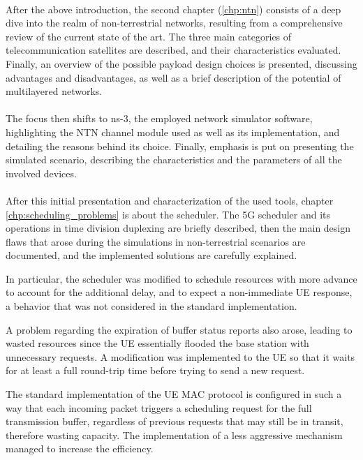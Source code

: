 \paragraph{}
After the above introduction, the second chapter (\ref{chp:ntn}) consists of a deep dive into the realm of non-terrestrial networks, resulting from a comprehensive review of the current state of the art. The three main categories of telecommunication satellites are described, and their characteristics evaluated. Finally, an overview of the possible payload design choices is presented, discussing advantages and disadvantages, as well as a brief description of the potential of multilayered networks.

\paragraph{}
The focus then shifts to ns-3, the employed network simulator software, highlighting the NTN channel module used as well as its implementation, and detailing the reasons behind its choice. Finally, emphasis is put on presenting the simulated scenario, describing the characteristics and the parameters of all the involved devices.

\paragraph{}
After this initial presentation and characterization of the used tools, chapter \ref{chp:scheduling_problems} is about the scheduler. The 5G scheduler and its operations in time division duplexing are briefly described, then the main design flaws that arose during the simulations in non-terrestrial scenarios are documented, and the implemented solutions are carefully explained. 

In particular, the scheduler was modified to schedule resources with more advance to account for the additional delay, and to expect a non-immediate \ac{UE} response, a behavior that was not considered in the standard implementation.

A problem regarding the expiration of buffer status reports also arose, leading to wasted resources since the \ac{UE} essentially flooded the base station with unnecessary requests. A modification was implemented to the \ac{UE} so that it waits for at least a full round-trip time before trying to send a new request.

The standard implementation of the \ac{UE} MAC protocol is configured in such a way that each incoming packet triggers a scheduling request for the full transmission buffer, regardless of previous requests that may still be in transit, therefore wasting capacity. The implementation of a less aggressive mechanism managed to increase the efficiency.


